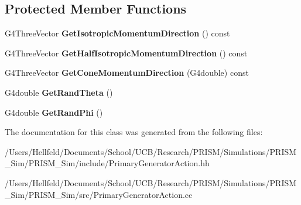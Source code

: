 \subsection*{Protected Member Functions}
\begin{DoxyCompactItemize}
\item 
\hypertarget{class_primary_generator_action_a040348143c8c552c155b620ba4ef0e84}{}\label{class_primary_generator_action_a040348143c8c552c155b620ba4ef0e84} 
G4\+Three\+Vector {\bfseries Get\+Isotropic\+Momentum\+Direction} () const
\item 
\hypertarget{class_primary_generator_action_ab80f80a97e9d9e7259157afd95a64fa3}{}\label{class_primary_generator_action_ab80f80a97e9d9e7259157afd95a64fa3} 
G4\+Three\+Vector {\bfseries Get\+Half\+Isotropic\+Momentum\+Direction} () const
\item 
\hypertarget{class_primary_generator_action_a63eb6aa5a357273cb4c61f25a3573bfe}{}\label{class_primary_generator_action_a63eb6aa5a357273cb4c61f25a3573bfe} 
G4\+Three\+Vector {\bfseries Get\+Cone\+Momentum\+Direction} (G4double) const
\item 
\hypertarget{class_primary_generator_action_afdfa3e6ae0e4d6867d4df4528ad97bca}{}\label{class_primary_generator_action_afdfa3e6ae0e4d6867d4df4528ad97bca} 
G4double {\bfseries Get\+Rand\+Theta} ()
\item 
\hypertarget{class_primary_generator_action_a67a51c7879b8db59054ea45797f58c50}{}\label{class_primary_generator_action_a67a51c7879b8db59054ea45797f58c50} 
G4double {\bfseries Get\+Rand\+Phi} ()
\end{DoxyCompactItemize}


The documentation for this class was generated from the following files\+:\begin{DoxyCompactItemize}
\item 
/\+Users/\+Hellfeld/\+Documents/\+School/\+U\+C\+B/\+Research/\+P\+R\+I\+S\+M/\+Simulations/\+P\+R\+I\+S\+M\+\_\+\+Sim/\+P\+R\+I\+S\+M\+\_\+\+Sim/include/Primary\+Generator\+Action.\+hh\item 
/\+Users/\+Hellfeld/\+Documents/\+School/\+U\+C\+B/\+Research/\+P\+R\+I\+S\+M/\+Simulations/\+P\+R\+I\+S\+M\+\_\+\+Sim/\+P\+R\+I\+S\+M\+\_\+\+Sim/src/Primary\+Generator\+Action.\+cc\end{DoxyCompactItemize}
